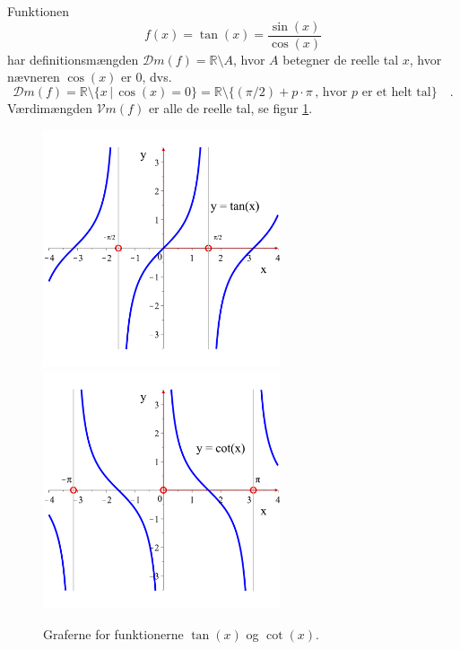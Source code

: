 \begin{example}[Tangens]
Funktionen
\begin{equation}
f(x) = \tan(x) = \frac{\sin(x)}{\cos(x)}
\end{equation}
har definitionsmængden $\mathcal{D}m(f) = \mathbb{R} \setminus A$, hvor $A$ betegner de reelle tal $x$, hvor nævneren $\cos(x)$ er $0$, dvs.
\begin{equation}
\mathcal{D}m(f) =  \mathbb{R} \setminus \{ x\,| \, \cos(x) = 0 \} = \mathbb{R} \setminus \{(\pi/2) + p \cdot \pi \, , \, \textrm{hvor $p$ er et helt tal} \}\quad.
\end{equation}
Værdimængden $\mathcal{V}m(f)$ er alle de reelle tal, se figur \ref{tn14.figplottancot}.
\end{example}

\begin{figure}[h]
\centerline{\includegraphics[height=70mm]{FIGS/plottan.pdf} \quad \quad \quad \includegraphics[height=70mm]{FIGS/plotcot.pdf}}
\begin{center}
\caption{Graferne for funktionerne $\tan(x)$ og $\cot(x)$.} \label{tn14.figplottancot}
\end{center}
\end{figure}




